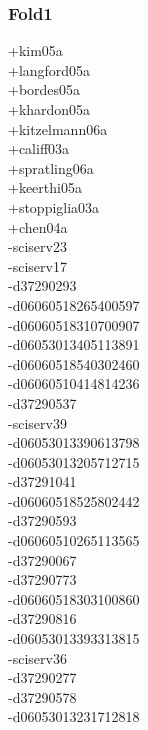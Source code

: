 \begin{multicols}{4}
\subsubsection*{Fold1}
+kim05a\\
+langford05a\\
+bordes05a\\
+khardon05a\\
+kitzelmann06a\\
+califf03a\\
+spratling06a\\
+keerthi05a\\
+stoppiglia03a\\
+chen04a\\
-sciserv23\\
-sciserv17\\
-d37290293\\
-d06060518265400597\\
-d06060518310700907\\
-d06053013405113891\\
-d06060518540302460\\
-d06060510414814236\\
-d37290537\\
-sciserv39\\
-d06053013390613798\\
-d06053013205712715\\
-d37291041\\
-d06060518525802442\\
-d37290593\\
-d06060510265113565\\
-d37290067\\
-d37290773\\
-d06060518303100860\\
-d37290816\\
-d06053013393313815\\
-sciserv36\\
-d37290277\\
-d37290578\\
-d06053013231712818\\

\end{multicols}
